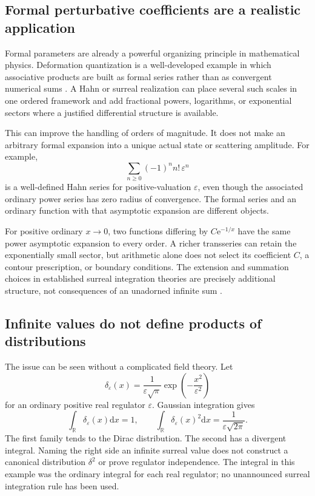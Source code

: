 \documentclass[11pt,a4paper]{article}
\numberwithin{equation}{section}
\theoremstyle{definition}
\theoremstyle{remark}
\newcommand{\R}{\mathbb R}
\newcommand{\dd}{\mathrm d}
\newcommand{\ee}{\mathrm e}
\begin{document}
\subsection{Formal perturbative coefficients are a realistic application}
Formal parameters are already a powerful organizing principle in mathematical
physics. Deformation quantization is a well-developed example in which
associative products are built as formal series rather than as convergent
numerical sums \cite{Kontsevich}. A Hahn or surreal realization can place
several such scales in one ordered framework and add fractional powers,
logarithms, or exponential sectors where a justified differential structure is
available.

This can improve the handling of orders of magnitude. It does not make an
arbitrary formal expansion into a unique actual state or scattering amplitude.
For example,
\begin{equation}\label{eq:factorial}
\sum_{n\ge0}(-1)^n n!\,\varepsilon^n
\end{equation}
is a well-defined Hahn series for positive-valuation $\varepsilon$, even though
the associated ordinary power series has zero radius of convergence. The
formal series and an ordinary function with that asymptotic expansion are
different objects.

For positive ordinary $x\to0$, two functions differing by
$C\ee^{-1/x}$ have the same power asymptotic expansion to every order.
A richer transseries can retain the exponentially small sector, but arithmetic
alone does not select its coefficient $C$, a contour prescription, or boundary
conditions. The extension and summation choices in established surreal
integration theories are precisely additional structure, not consequences of
an unadorned infinite sum \cite{CE,BMgerms}.

\subsection{Infinite values do not define products of distributions}
The issue can be seen without a complicated field theory. Let
\[
\delta_\varepsilon(x)=\frac{1}{\varepsilon\sqrt\pi}
                \exp\left(-\frac{x^2}{\varepsilon^2}\right)
\]
for an ordinary positive real regulator $\varepsilon$. Gaussian integration
gives
\begin{equation}\label{eq:deltareg}
\int_\R\delta_\varepsilon(x)\dd x=1,
\qquad
\int_\R\delta_\varepsilon(x)^2\dd x
   =\frac1{\varepsilon\sqrt{2\pi}}.
\end{equation}
The first family tends to the Dirac distribution. The second has a divergent
integral. Naming the right side an infinite surreal value does not construct a
canonical distribution $\delta^2$ or prove regulator independence. The integral
in this example was the ordinary integral for each real regulator; no
unannounced surreal integration rule has been used.
\end{document}
